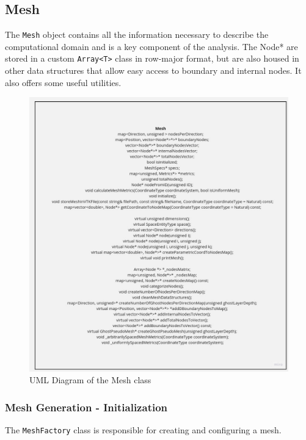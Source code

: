 \documentclass{article}
\begin{document}
	\subsection{Mesh}
	The \texttt{Mesh} object contains all the information necessary to describe the computational domain and is a key component of the analysis. The Node* are stored in a custom \texttt{Array<T>} class in row-major format, but are also housed in other data structures that allow easy access to boundary and internal nodes. It also offers some useful utilities.
	\begin{figure}[H]
		
		\includegraphics[height=1.0\textheight, width=1.05\textwidth, keepaspectratio]{./images/mesh.jpg}
		\caption{UML Diagram of the Mesh class}
		\label{fig:UML_mesh}
	\end{figure}

	\newpage
	
	\subsubsection{Mesh Generation - Initialization}

		

	The \texttt{MeshFactory} class is responsible for creating and configuring a mesh.
		
\end{document}
